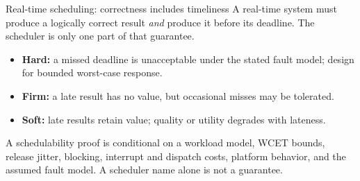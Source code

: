 \documentclass[aspectratio=169,11pt]{beamer}
\begin{document}
\begin{frame}{Real-time scheduling: correctness includes timeliness}
  \small
  A real-time system must produce a logically correct result \emph{and} produce it before its deadline. The scheduler is only one part of that guarantee.
  \begin{itemize}
    \item \textbf{Hard:} a missed deadline is unacceptable under the stated fault model; design for bounded worst-case response.
    \item \textbf{Firm:} a late result has no value, but occasional misses may be tolerated.
    \item \textbf{Soft:} late results retain value; quality or utility degrades with lateness.
  \end{itemize}
  \begin{tcolorbox}[title=Guarantee boundary,colback=orange!5,colframe=orange!70]
    A schedulability proof is conditional on a workload model, WCET bounds, release jitter, blocking, interrupt and dispatch costs, platform behavior, and the assumed fault model. A scheduler name alone is not a guarantee.
  \end{tcolorbox}
\end{frame}
\end{document}
